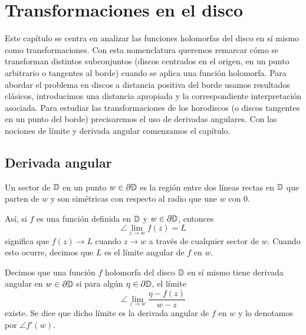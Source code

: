 \chapter{Transformaciones en el disco}
\label{cap:angular}

Este capítulo se centra en analizar las funciones holomorfas del disco en sí mismo como transformaciones. Con esta nomenclatura queremos remarcar cómo se transforman distintos subconjuntos (discos centrados en el origen, en un punto arbitrario o tangentes al borde) cuando se aplica una función holomorfa. Para abordar el problema en discos a distancia positiva del borde usamos resultados clásicos, introducimos una distancia apropiada y la correspondiente interpretación asociada. Para estudiar las transformaciones de los horodiscos (o discos tangentes en un punto del borde) precisaremos el uso de derivadas angulares. Con las nociones de límite y derivada angular comenzamos el capítulo. \\

\section{Derivada angular}

\begin{definition}
    Un sector de $\mathbb{D}$ en un punto $w \in \partial \mathbb{D}$ es la región entre dos líneas rectas en $\mathbb{D}$ que parten de $w$ y son simétricas con respecto  al radio que une $w$ con $0$.
\end{definition}

Así, si $f$ es una función definida en $\mathbb{D}$ y $w \in \partial \mathbb{D}$, entonces
    \begin{equation}
        \angle \lim_{z \to w} f(z) = L
    \end{equation}
    significa que $f(z) \to L$ cuando $z \to w$ a través de cualquier sector de $w$. Cuando esto ocurre, decimos que $L$ es el límite angular de $f$ en $w$. \\

\begin{definition}
    Decimos que una función $f$ holomorfa del disco $\mathbb{D}$ en sí mismo tiene derivada angular en $w \in \partial \mathbb{D}$ si para algún $\eta \in \partial \mathbb{D}$, el límite
    \begin{equation*}
        \angle \lim_{z \to w} \frac{\eta - f(z)}{w - z}
    \end{equation*}
    existe. Se dice que dicho límite es la derivada angular de $f$ en $w$ y lo denotamos por $\angle f'(w)$.
\end{definition}

